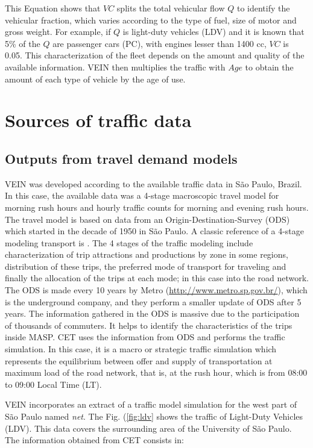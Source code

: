 \documentclass[12pt,graybox,envcountchap,sectrefs]{krantz}
\theoremstyle{definition}
\theoremstyle{definition}
\theoremstyle{definition}
\theoremstyle{remark}
\begin{document}
This Equation shows that \(VC\) splits the total vehicular flow \(Q\) to
identify the vehicular fraction, which varies according to the type of
fuel, size of motor and gross weight. For example, if \(Q\) is
light-duty vehicles (LDV) and it is known that 5\% of the \(Q\) are
passenger cars (PC), with engines lesser than 1400 cc, \(VC\) is 0.05.
This characterization of the fleet depends on the amount and quality of
the available information. VEIN then multiplies the traffic with \(Age\)
to obtain the amount of each type of vehicle by the age of use.

\section{Sources of traffic data}\label{sources-of-traffic-data}

\subsection{Outputs from travel demand
models}\label{outputs-from-travel-demand-models}

VEIN was developed according to the available traffic data in São Paulo,
Brazil. In this case, the available data was a 4-stage macroscopic
travel model for morning rush hours and hourly traffic counts for
morning and evening rush hours. The travel model is based on data from
an Origin-Destination-Survey (ODS) \citep{ODS} which started in the
decade of 1950 in São Paulo. A classic reference of a 4-stage modeling
transport is \citep{OrtuzarWillumsen2002}. The 4 stages of the traffic
modeling include characterization of trip attractions and productions by
zone in some regions, distribution of these trips, the preferred mode of
transport for traveling and finally the allocation of the trips at each
mode; in this case into the road network. The ODS is made every 10 years
by Metro (\url{http://www.metro.sp.gov.br/}), which is the underground
company, and they perform a smaller update of ODS after 5 years. The
information gathered in the ODS is massive due to the participation of
thousands of commuters. It helps to identify the characteristics of the
trips inside MASP. CET uses the information from ODS and performs the
traffic simulation. In this case, it is a macro or strategic traffic
simulation which represents the equilibrium between offer and supply of
transportation at maximum load of the road network, that is, at the rush
hour, which is from 08:00 to 09:00 Local Time (LT).

VEIN incorporates an extract of a traffic model simulation for the west
part of São Paulo named \emph{net}. The Fig. (\ref{fig:ldv} shows the
traffic of Light-Duty Vehicles (LDV). This data covers the surrounding
area of the University of São Paulo. The information obtained from CET
consists in:
\end{document}
